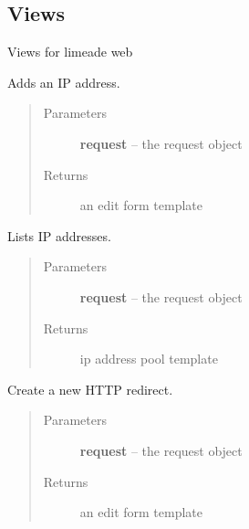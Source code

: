 \documentclass[letterpaper,10pt,english]{sphinxmanual}
\begin{document}
\subsection{Views}
\label{api/web:module-limeade.web.views}\label{api/web:views}
Views for limeade web

\begin{fulllineitems}
\label{api/web:limeade.web.views.poolip_add}
Adds an IP address.
\begin{quote}\begin{description}
\item[{Parameters}] \leavevmode
\textbf{request} -- the request object

\item[{Returns}] \leavevmode
an edit form template

\end{description}\end{quote}

\end{fulllineitems}


\begin{fulllineitems}
\label{api/web:limeade.web.views.poolip_list}
Lists IP addresses.
\begin{quote}\begin{description}
\item[{Parameters}] \leavevmode
\textbf{request} -- the request object

\item[{Returns}] \leavevmode
ip address pool template

\end{description}\end{quote}

\end{fulllineitems}


\begin{fulllineitems}
\label{api/web:limeade.web.views.redirect_add}
Create a new HTTP redirect.
\begin{quote}\begin{description}
\item[{Parameters}] \leavevmode
\textbf{request} -- the request object

\item[{Returns}] \leavevmode
an edit form template

\end{description}\end{quote}

\end{fulllineitems}
\end{document}
